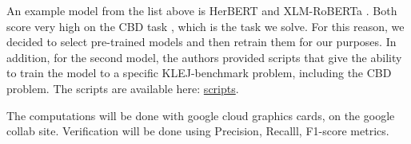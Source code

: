 \documentclass[a4paper]{article}
\begin{document}
An example model from the list above is HerBERT \cite{mroczkowski-etal-2021-herbert} and XLM-RoBERTa \cite{dadas2020pretraining}. Both score very high on the CBD task \cite{ptaszynski2019results}, which is the task we solve. For this reason, we decided to select pre-trained models and then retrain them for our purposes.
In addition, for the second model, the authors provided scripts that give the ability to train the model to a specific KLEJ-benchmark problem, including the CBD problem. The scripts are available here: \href{https://github.com/sdadas/polish-roberta}{scripts}.

The computations will be done with google cloud graphics cards, on the google collab site. Verification will be done using Precision, Recalll, F1-score metrics.

\printbibliography
\end{document}
